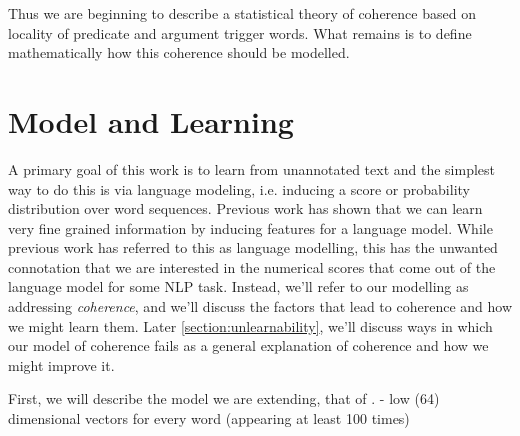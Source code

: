 \documentclass[11pt,letterpaper]{article}
\begin{document}
Thus we are beginning to describe a statistical theory of coherence
based on locality of predicate and argument trigger words.
What remains is to define mathematically how this coherence should be modelled.


\section{Model and Learning} %


A primary goal of this work is to learn from unannotated text and
the simplest way to do this is via language modeling, i.e. inducing
a score or probability distribution over word sequences.
Previous work has shown that we can learn very fine grained information
by inducing features for a language model.
While previous work has referred to this as language modelling,
this has the unwanted connotation that we are interested in the
numerical scores that come out of the language model for some NLP task.
Instead, we'll refer to our modelling as addressing {\em coherence},
and we'll discuss the factors that lead to coherence and how we might learn them. 
Later \ref{section:unlearnability}, we'll discuss ways in which our model of coherence
fails as a general explanation of coherence and how we might improve it.

First, we will describe the model we are extending, that of \cite{rami}.
- low (64) dimensional vectors for every word (appearing at least 100 times)


\end{document}

